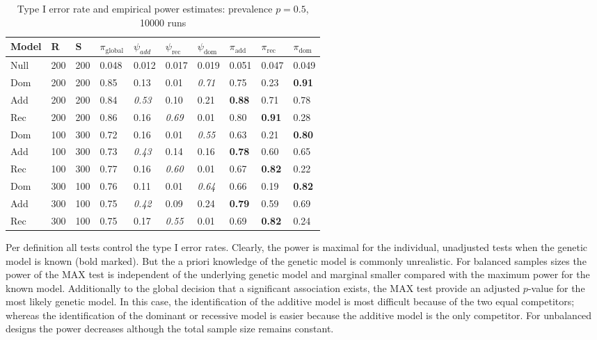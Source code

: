 \documentclass[bimj,fleqn]{w-art}
\begin{document}
\begin{table}
\begin{center}
\caption{Type I error rate and empirical power estimates: prevalence $p=0.5$, 10000 runs \label{simtab}}
\vspace*{0.5cm}
  \begin{tabular}{l l l l| l l l |l l l}
        Model & R & S & $\pi_{\text{global}}$ &  $\psi_{add}$ & $\psi_\text{rec}$ & $\psi_\text{dom}$ & $\pi_\text{add}$ & $\pi_\text{rec}$ & $\pi_\text{dom}$   \\
 \hline
 Null & 200 & 200 & 0.048&  0.012 & 0.017&  0.019           &   0.051 & 0.047 & 0.049 \\
 Dom  & 200 & 200 & 0.85 &  0.13 &  0.01 &  \textit{0.71} & 0.75 &  0.23 &  \textbf{0.91} \\
 Add  & 200 & 200 & 0.84 &  \textit{0.53} & 0.10  & 0.21 &  \textbf{0.88} & 0.71 &  0.78 \\
 Rec  & 200 & 200 & 0.86 &  0.16 &  \textit{0.69} & 0.01 &  0.80 &  \textbf{0.91} & 0.28 \\
 Dom  & 100 & 300 & 0.72 &  0.16 &  0.01 &  \textit{0.55}&  0.63 &  0.21 & \textbf{0.80} \\
 Add  & 100 & 300 & 0.73 &  \textit{0.43} & 0.14 &  0.16 &  \textbf{0.78} & 0.60 &  0.65 \\
 Rec  & 100 & 300 & 0.77 &  0.16 &  \textit{0.60} & 0.01 &  0.67 &  \textbf{0.82} & 0.22  \\
 Dom  & 300 & 100 & 0.76 &  0.11 &  0.01 &  \textit{0.64} & 0.66 &  0.19 &  \textbf{0.82} \\
 Add  & 300 & 100 & 0.75 &  \textit{0.42} & 0.09 &  0.24 &  \textbf{0.79} & 0.59 &  0.69 \\
 Rec  & 300 & 100 & 0.75 &  0.17 &  \textit{0.55} & 0.01 &  0.69 &  \textbf{0.82 }& 0.24 \\
\hline
 \end{tabular}
\end{center}
 \end{table} 

 
Per definition all tests control the type I error rates. Clearly, the power is maximal for 
the individual, unadjusted tests when the genetic model is known (bold marked). But the a 
priori knowledge of the genetic model is commonly unrealistic. For balanced samples sizes the power 
of the MAX test is independent of the underlying genetic model and marginal smaller 
compared with the maximum power for the known model. Additionally to the global decision 
that a significant association exists, the MAX test provide an adjusted $p$-value for the 
most likely genetic model. In this case, the identification of the additive model is most difficult 
because of the two equal competitors; whereas the identification of the dominant or recessive 
model is easier because the additive model is the only competitor. For unbalanced 
designs the power decreases although the total sample size remains constant.
\end{document}
